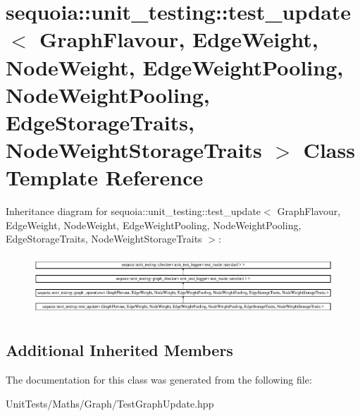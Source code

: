 \hypertarget{classsequoia_1_1unit__testing_1_1test__update}{}\section{sequoia\+::unit\+\_\+testing\+::test\+\_\+update$<$ Graph\+Flavour, Edge\+Weight, Node\+Weight, Edge\+Weight\+Pooling, Node\+Weight\+Pooling, Edge\+Storage\+Traits, Node\+Weight\+Storage\+Traits $>$ Class Template Reference}
\label{classsequoia_1_1unit__testing_1_1test__update}
Inheritance diagram for sequoia\+::unit\+\_\+testing\+::test\+\_\+update$<$ Graph\+Flavour, Edge\+Weight, Node\+Weight, Edge\+Weight\+Pooling, Node\+Weight\+Pooling, Edge\+Storage\+Traits, Node\+Weight\+Storage\+Traits $>$\+:\begin{figure}[H]
\begin{center}
\leavevmode
\includegraphics[height=2.251256cm]{classsequoia_1_1unit__testing_1_1test__update}
\end{center}
\end{figure}
\subsection*{Additional Inherited Members}


The documentation for this class was generated from the following file\+:\begin{DoxyCompactItemize}
\item 
Unit\+Tests/\+Maths/\+Graph/Test\+Graph\+Update.\+hpp\end{DoxyCompactItemize}
